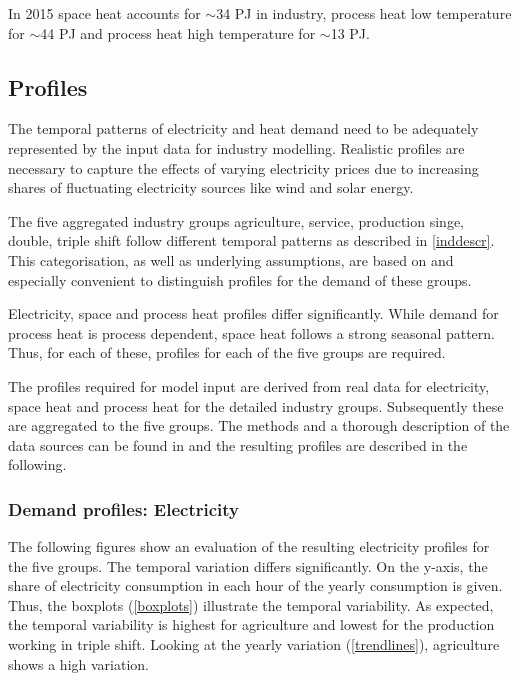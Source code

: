 \documentclass[review]{elsarticle}
\begin{document}
In 2015 space heat accounts for $\sim$34 PJ in industry, process heat low temperature for $\sim$44 PJ and process heat high temperature for $\sim$13 PJ.


\subsection{Profiles}
\label{sec:profiles}

The temporal patterns of electricity and heat demand need to be adequately represented by the input data for industry modelling. Realistic profiles are necessary to capture the effects of varying electricity prices due to increasing shares of fluctuating electricity sources like wind and solar energy.

The five aggregated industry groups agriculture, service, production singe, double, triple shift follow different temporal patterns as described in \autoref{inddescr}. This categorisation, as well as underlying assumptions, are based on \cite{VM2016} and especially convenient to distinguish profiles for the demand of these groups. 

Electricity, space and process heat profiles differ significantly. While demand for process heat is process dependent, space heat follows a strong seasonal pattern. Thus, for each of these, profiles for each of the five groups are required.

The profiles required for model input are derived from real data for electricity, space heat and process heat for the detailed industry groups. Subsequently these are aggregated to the five groups. The methods and a thorough description of the data sources can be found in\cite{Wiese2017} and the resulting profiles are described in the following.

\subsubsection{Demand profiles: Electricity}

The following figures show an evaluation of the resulting electricity profiles for the five groups. The temporal variation differs significantly. On the y-axis, the share of electricity consumption in each hour of the yearly consumption is given. Thus, the boxplots (\autoref{boxplots}) illustrate the temporal variability. As expected, the temporal variability is highest for agriculture and lowest for the production working in triple shift. Looking at the yearly variation (\autoref{trendlines}), agriculture shows a high variation.
\end{document}
